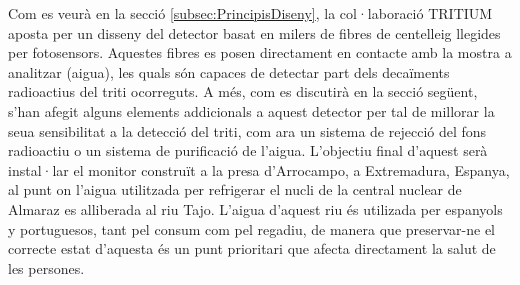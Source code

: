 Com es veurà en la secció \ref{subsec:PrincipisDiseny}, la col·laboració TRITIUM aposta per un disseny del detector basat en milers de fibres de centelleig llegides per fotosensors. Aquestes fibres es posen directament en contacte amb la mostra a analitzar (aigua), les quals són capaces de detectar part dels decaïments radioactius del triti ocorreguts. A més, com es discutirà en la secció següent, s'han afegit alguns elements addicionals a aquest detector per tal de millorar la seua sensibilitat a la detecció del triti, com ara un sistema de rejecció del fons radioactiu o un sistema de purificació de l'aigua. L'objectiu final d'aquest serà instal·lar el monitor construït a la presa d'Arrocampo, a Extremadura, Espanya, al punt on l'aigua utilitzada per refrigerar el nucli de la central nuclear de Almaraz es alliberada al riu Tajo. L'aigua d'aquest riu és utilizada per espanyols y portuguesos, tant pel consum com pel regadiu, de manera que preservar-ne el correcte estat d'aquesta és un punt prioritari que afecta directament la salut de les persones. 